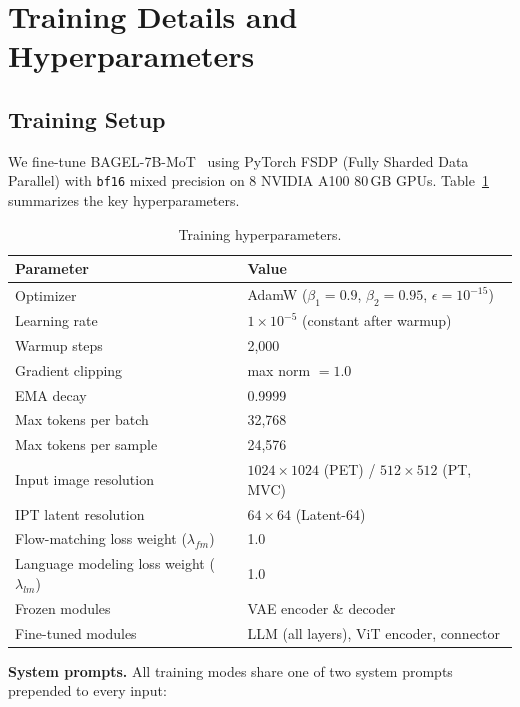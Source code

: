 \clearpage
\setcounter{page}{1}
\maketitlesupplementary


\section{Training Details and Hyperparameters}
\label{supp_train}

\subsection{Training Setup}
\label{supp_train_setup}

We fine-tune BAGEL-7B-MoT~\cite{deng2025bagel} using PyTorch FSDP (Fully Sharded Data Parallel) with \texttt{bf16} mixed precision on 8 NVIDIA A100 80\,GB GPUs.
Table~\ref{tab:supp_hyperparams} summarizes the key hyperparameters.

\begin{table}[h]
\centering
\caption{Training hyperparameters.}
\label{tab:supp_hyperparams}
\small
\begin{tabular}{ll}
\toprule
\textbf{Parameter} & \textbf{Value} \\
\midrule
Optimizer & AdamW ($\beta_1{=}0.9$, $\beta_2{=}0.95$, $\epsilon{=}10^{-15}$) \\
Learning rate & $1 \times 10^{-5}$ (constant after warmup) \\
Warmup steps & 2{,}000 \\
Gradient clipping & max norm $= 1.0$ \\
EMA decay & 0.9999 \\
\midrule
Max tokens per batch & 32{,}768 \\
Max tokens per sample & 24{,}576 \\
Input image resolution & $1024 \times 1024$ (PET) / $512 \times 512$ (PT, MVC) \\
IPT latent resolution & $64 \times 64$ (Latent-64) \\
\midrule
Flow-matching loss weight ($\lambda_{fm}$) & 1.0 \\
Language modeling loss weight ($\lambda_{lm}$) & 1.0 \\
\midrule
Frozen modules & VAE encoder \& decoder \\
Fine-tuned modules & LLM (all layers), ViT encoder, connector \\
\bottomrule
\end{tabular}
\end{table}

\noindent\textbf{System prompts.}
All training modes share one of two system prompts prepended to every input:

